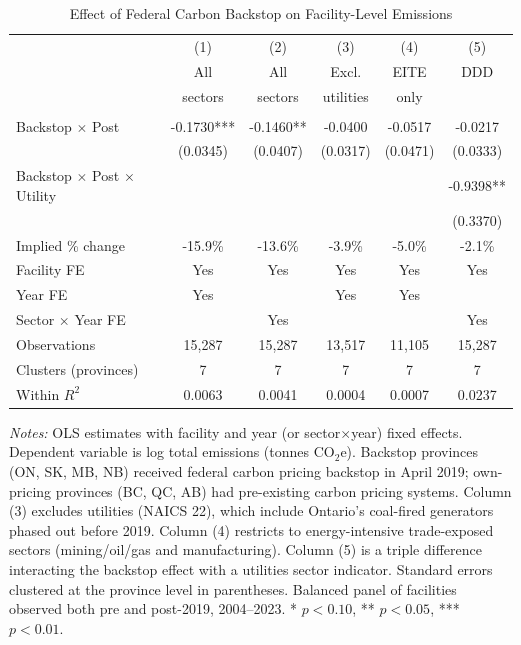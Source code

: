 \begin{table}[htbp]
\centering
\caption{Effect of Federal Carbon Backstop on Facility-Level Emissions}
\label{tab:main}
\begin{tabular}{lccccc}
\hline\hline
 & (1) & (2) & (3) & (4) & (5) \\
 & All & All & Excl. & EITE & DDD \\
 & sectors & sectors & utilities & only & \\
\hline
\addlinespace
\multicolumn{6}{l}{\textit{Dependent variable: log(emissions, tonnes CO$_2$e)}} \\
\addlinespace
Backstop $\times$ Post & -0.1730*** & -0.1460** & -0.0400 & -0.0517 & -0.0217 \\
 & (0.0345) & (0.0407) & (0.0317) & (0.0471) & (0.0333) \\
Backstop $\times$ Post $\times$ Utility & & & & & -0.9398** \\
 & & & & & (0.3370) \\
\addlinespace
Implied \% change & -15.9\% & -13.6\% & -3.9\% & -5.0\% & -2.1\% \\
\hline
Facility FE & Yes & Yes & Yes & Yes & Yes \\
Year FE & Yes & & Yes & Yes & \\
Sector $\times$ Year FE & & Yes & & & Yes \\
Observations & 15,287 & 15,287 & 13,517 & 11,105 & 15,287 \\
Clusters (provinces) & 7 & 7 & 7 & 7 & 7 \\
Within $R^2$ & 0.0063 & 0.0041 & 0.0004 & 0.0007 & 0.0237 \\
\hline\hline
\end{tabular}
\begin{tablenotes}
\small
\item \textit{Notes:} OLS estimates with facility and year (or sector$\times$year) fixed effects. Dependent variable is log total emissions (tonnes CO$_2$e). Backstop provinces (ON, SK, MB, NB) received federal carbon pricing backstop in April 2019; own-pricing provinces (BC, QC, AB) had pre-existing carbon pricing systems. Column (3) excludes utilities (NAICS 22), which include Ontario's coal-fired generators phased out before 2019. Column (4) restricts to energy-intensive trade-exposed sectors (mining/oil/gas and manufacturing). Column (5) is a triple difference interacting the backstop effect with a utilities sector indicator. Standard errors clustered at the province level in parentheses. Balanced panel of facilities observed both pre and post-2019, 2004--2023. * $p<0.10$, ** $p<0.05$, *** $p<0.01$.
\end{tablenotes}
\end{table}

